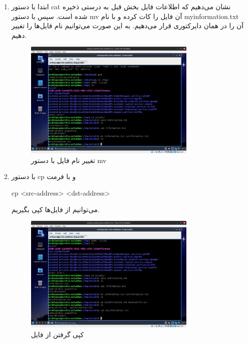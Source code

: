 \documentclass[12pt]{article}
\begin{document}
\begin{enumerate}
        \item 
        ابتدا با دستور
        cat
        نشان می‌دهیم که اطلاعات فایل بخش قبل به درستی ذخیره شده است. سپس با دستور 
        mv
        آن فایل را کات کرده و با نام
        myinformation.txt
        آن را در همان دایرکتوری قرار می‌دهیم. به این صورت می‌توانیم نام فایل‌ها را تغییر دهیم.

        \begin{figure}[H]
		\centering
		\includegraphics[width=0.8\textwidth]{report1-resources/12.png}
		\caption{تغییر نام فایل با دستور mv}
	\end{figure}

        \item 
        با دستور 
        cp
        و با فرمت
        
        \begin{english}
            cp <src-address> <dst-address>
        \end{english}
        
        می‌توانیم از فایل‌ها کپی بگیریم.

        \begin{figure}[H]
		\centering
		\includegraphics[width=0.8\textwidth]{report1-resources/13.png}
		\caption{کپی گرفتن از فایل}
            \label{im13}
	\end{figure}


\end{enumerate}
\end{document}
